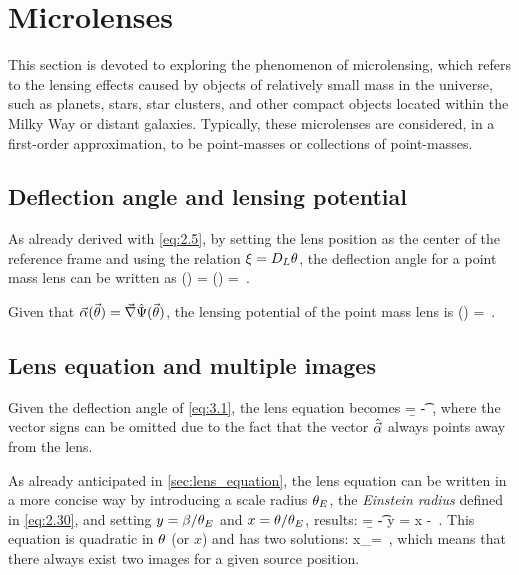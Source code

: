 \section{Microlenses}
\label{sec:microlenses}

This section is devoted to exploring the phenomenon of microlensing, which refers to the lensing effects caused by objects of relatively small mass in the universe, such as planets, stars, star clusters, and other compact objects located within the Milky Way or distant galaxies. Typically, these microlenses are considered, in a first-order approximation, to be point-masses or collections of point-masses.


\subsection{Deflection angle and lensing potential}
\label{subsec:angle_potential}
As already derived with \cref{eq:2.5}, by setting the lens position as the center of the reference frame and using the relation $\xi = D_L \theta$, the deflection angle for a point mass lens can be written as
\be
\label{eq:3.1}
\va{\a} (\va{\t}) =  \hat{\va{\a}} (\va{\t}) =    \,.
\ee

Given that $\va{\alpha} (\va{\theta}) = \va{\nabla} \hat{\Psi} (\va{\theta})$, the lensing potential of the point mass lens is
\be
\label{eq:3.2}
\hat{\P} (\va{\t}) =   \ln{|\va{\t}|} \,.
\ee


\subsection{Lens equation and multiple images}
\label{subsec:lenseq_images}
Given the deflection angle of \cref{eq:3.1}, the lens equation becomes
\be
\label{eq:3.3}
\b = \t -   \,,
\ee
where the vector signs can be omitted due to the fact that the vector $\hat{\va{\alpha}}$ always points away from the lens.

As already anticipated in \cref{sec:lens_equation}, the lens equation can be written in a more concise way by introducing a scale radius $\theta_E$, \ie the \emph{Einstein radius} defined in \cref{eq:2.30}, and setting $y = \beta / \theta_E$ and $x = \theta / \theta_E$, results:
\be
\label{eq:3.4}
\b = \t -  \quad \Rightarrow \quad y = x -  \,.
\ee
This equation is quadratic in $\theta$ (or $x$) and has two solutions:
\be
\label{eq:3.5}
x_\pm =  \,,
\ee
which means that there always exist two images for a given source position.

